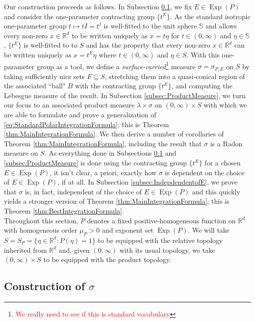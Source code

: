 \documentclass[11pt]{article}
\theoremstyle{theorem}
\newcommand\Exp{\operatorname{Exp}}
\begin{document}
\noindent Our construction proceeds as follows. In Subsection \ref{subsec:ConstructionofSigma}, we fix $E\in\Exp(P)$ and consider the one-parameter contracting group $\{t^E\}$. As the standard isotropic one-parameter group $t\mapsto tI=t^I$ is well-fitted to the unit sphere $\mathbb{S}$ and allows every non-zero $x\in\mathbb{R}^d$ to be written uniquely as $x=t\eta$ for $t\in (0,\infty)$ and $\eta\in \mathbb{S}$, $\{t^E\}$ is well-fitted to to $S$ and has the property that every non-zero $x\in\mathbb{R}^d$ can be written uniquely as $x=t^E\eta$ where $t\in(0,\infty)$ and $\eta\in S$. With this one-parameter group as a tool, we define a \textit{surface-carried}\footnote{\textcolor{red}{We really need to see if this is standard vocabulary}} measure $\sigma=\sigma_{P,E}$ on $S$ by taking sufficiently nice sets $F\subseteq S$, stretching them into a quasi-conical region of the associated ``ball" $B$ with the contracting group $\{t^E\}$, and computing the Lebesgue measure of the result. In Subsection \ref{subsec:ProductMeasure}, we turn our focus to an associated product measure $\lambda\times\sigma$ on $(0,\infty)\times S$ with which we are able to formulate and prove a generalization of \eqref{eq:StandardPolarIntegrationFormula}; this is Theorem \ref{thm:MainIntegrationFormula}. We then derive a number of corollaries of Theorem \ref{thm:MainIntegrationFormula}, including the result that $\sigma$ is a Radon measure on $S$. As everything done in Subsections \ref{subsec:ConstructionofSigma} and \ref{subsec:ProductMeasure} is done using the contracting group $\{t^E\}$ for a chosen $E\in\Exp(P)$, it isn't clear, a priori, exactly how $\sigma$ is dependent on the choice of $E\in\Exp(P)$, if at all. In Subsection \ref{subsec:IndepdendentofE}, we prove that $\sigma$ is, in fact, independent of the choice of $E\in \Exp(P)$ and this quickly yields a stronger version of Theorem \ref{thm:MainIntegrationFormula}; this is Theorem \ref{thm:BestIntegrationFormula}.\\

\noindent Throughout this section, $P$ denotes a fixed positive-homogeneous function on $\mathbb{R}^d$ with homogeneous order $\mu_P>0$ and exponent set $\Exp(P)$. We will take $S=S_P=\{\eta\in\mathbb{R}^d:P(\eta)=1\}$ to be equipped with the relative topology inherited from $\mathbb{R}^d$ and, given $(0,\infty)$ with its usual topology, we take $(0,\infty)\times S$ to be equipped with the product topology. 


\subsection{Construction of $\sigma$}\label{subsec:ConstructionofSigma}
 
\end{document}
